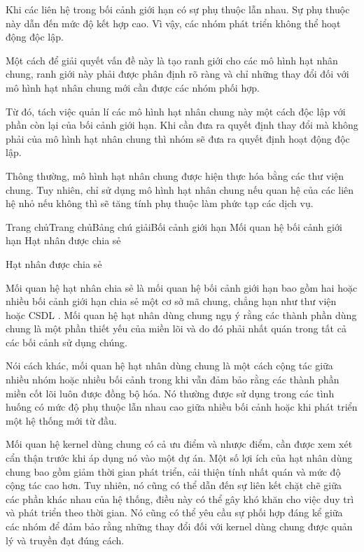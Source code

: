 Khi các liên hệ trong bối cảnh giới hạn có sự phụ thuộc lẫn nhau. Sự phụ thuộc này dẫn đến mức độ kết hợp cao. Vì vậy, các nhóm phát triển không thể hoạt động độc lập.

Một cách để giải quyết vấn đề này là tạo ranh giới cho các mô hình hạt nhân chung, ranh giới này phải được phân định rõ ràng và chỉ những thay đổi đối với mô hình hạt nhân chung mới cần được các nhóm phối hợp.

Từ đó, tách việc quản lí các mô hình hạt nhân chung này một cách độc lập với phần còn lại của bối cảnh giới hạn. Khi cần đưa ra quyết định thay đổi mà không phải của mô hình hạt nhân chung thì nhóm sẽ đưa ra quyết định hoạt động độc lập.

Thông thường, mô hình hạt nhân chung được hiện thực hóa bằng các thư viện chung. Tuy nhiên, chỉ sử dụng mô hình hạt nhân chung nếu quan hệ của các liên hệ nhỏ nếu không thì sẽ tăng tính phụ thuộc làm phức tạp các dịch vụ.




Trang chủTrang chủBảng chú giảiBối cảnh giới hạn Mối quan hệ bối cảnh giới hạn Hạt nhân được chia sẻ

Hạt nhân được chia sẻ

Mối quan hệ hạt nhân chia sẻ là mối quan hệ bối cảnh giới hạn bao gồm hai hoặc nhiều bối cảnh giới hạn chia sẻ một cơ sở mã chung, chẳng hạn như thư viện hoặc CSDL . Mối quan hệ hạt nhân dùng chung ngụ ý rằng các thành phần dùng chung là một phần thiết yếu của miền lõi và do đó phải nhất quán trong tất cả các bối cảnh sử dụng chúng.

Nói cách khác, mối quan hệ hạt nhân dùng chung là một cách cộng tác giữa nhiều nhóm hoặc nhiều bối cảnh trong khi vẫn đảm bảo rằng các thành phần miền cốt lõi luôn được đồng bộ hóa. Nó thường được sử dụng trong các tình huống có mức độ phụ thuộc lẫn nhau cao giữa nhiều bối cảnh hoặc khi phát triển một hệ thống mới từ đầu.

Mối quan hệ kernel dùng chung có cả ưu điểm và nhược điểm, cần được xem xét cẩn thận trước khi áp dụng nó vào một dự án. Một số lợi ích của hạt nhân dùng chung bao gồm giảm thời gian phát triển, cải thiện tính nhất quán và mức độ cộng tác cao hơn. Tuy nhiên, nó cũng có thể dẫn đến sự liên kết chặt chẽ giữa các phần khác nhau của hệ thống, điều này có thể gây khó khăn cho việc duy trì và phát triển theo thời gian. Nó cũng có thể yêu cầu sự phối hợp đáng kể giữa các nhóm để đảm bảo rằng những thay đổi đối với kernel dùng chung được quản lý và truyền đạt đúng cách.

